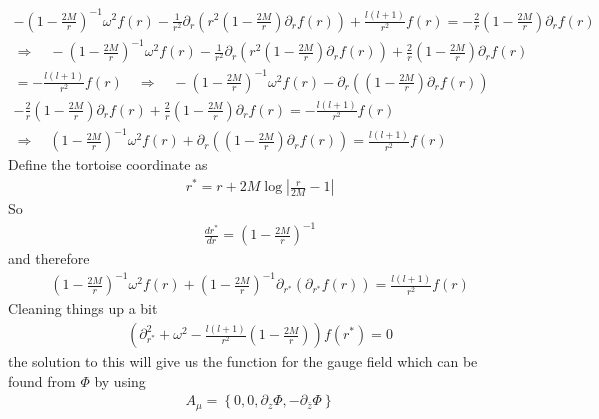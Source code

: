 \documentclass[12pt]{article}
\def\nn{\nonumber}
\begin{document}
\begin{gather}
-(1 - \frac{2 M}{r})^{-1}
\omega^{2}f(r)
-
\frac{1}{r^{2}}
\partial_{r}
\left(
r^{2} (1 - \frac{2 M}{r}) \partial_{r}f(r)
\right)
+
\frac{l (l +1)}{r^{2}}f(r)
=
-\frac{2}{r}
(1 - \frac{2 M}{r})
\partial_{r}
f(r)
\nn \\
\Rightarrow
\quad
-(1 - \frac{2 M}{r})^{-1}
\omega^{2}f(r)
-
\frac{1}{r^{2}}
\partial_{r}
\left(
r^{2} (1 - \frac{2 M}{r}) \partial_{r}f(r)
\right)
+
\frac{2}{r}
(1 - \frac{2 M}{r})
\partial_{r}
f(r)
\nn \\
=
-
\frac{l (l +1)}{r^{2}}f(r)
\quad
\Rightarrow
\quad
-(1 - \frac{2 M}{r})^{-1}
\omega^{2}f(r)
-
\partial_{r}
\left(
(1 - \frac{2 M}{r}) \partial_{r}f(r)
\right)
\nn \\
-
\frac{2}{r}
(1 - \frac{2 M}{r}) \partial_{r}f(r)
+
\frac{2}{r}
(1 - \frac{2 M}{r})
\partial_{r}
f(r)
=
-
\frac{l (l +1)}{r^{2}}f(r)
\nn \\
\Rightarrow
\quad
(1 - \frac{2 M}{r})^{-1}
\omega^{2}f(r)
+
\partial_{r}
\left(
(1 - \frac{2 M}{r}) \partial_{r}f(r)
\right)
=
\frac{l (l +1)}{r^{2}}f(r)
\end{gather}
Define the tortoise coordinate as
\begin{gather}
r^{\ast}
=
r+
2 M\log\left|\frac{r}{2 M} -1\right|
\end{gather}
So
\begin{gather}
\frac{d r^{\ast}}{d r}
=
(1 - \frac{2 M}{r})^{-1}
\end{gather}
and therefore
\begin{gather}
(1 - \frac{2 M}{r})^{-1}
\omega^{2}f(r)
+
(1 - \frac{2 M}{r})^{-1}
\partial_{r^{\ast}}
\left(
\partial_{r^{\ast}}f(r)
\right)
=
\frac{l (l +1)}{r^{2}}f(r)
\end{gather}
Cleaning things up a bit
\begin{gather}
\left(
\partial_{r^{\ast}}^{2}
+
\omega^{2}
-
\frac{l (l +1)}{r^{2}}
(1 - \frac{2 M}{r})
\right)
f(r^{\ast})
=0
\end{gather}
the solution to this will give us the function for the gauge field which can be found from $\Phi$ by using
\begin{gather}
A_{\mu}
=
\left\{
0, 0, \partial_{z} \Phi , - \partial_{\bar{z}} \Phi
\right\}
\end{gather}
\end{document}
